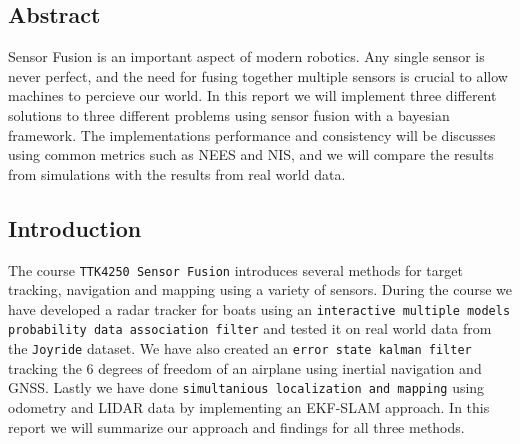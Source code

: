 \subsection{Abstract}
Sensor Fusion is an important aspect of modern robotics. Any single sensor is never perfect, and the need for fusing together multiple sensors is crucial to allow machines to percieve our world. In this report we will implement three different solutions to three different problems using sensor fusion with a bayesian framework. The implementations performance and consistency will be discusses using common metrics such as NEES and NIS, and we will compare the results from simulations with the results from real world data.
\subsection{Introduction}
The course \texttt{TTK4250 Sensor Fusion} introduces several methods for target tracking, navigation and mapping using a variety of sensors. During the course we have developed a radar tracker for boats using an \texttt{interactive multiple models probability data association filter} and tested it on real world data from the \texttt{Joyride} dataset. We have also created an \texttt{error state kalman filter} tracking the 6 degrees of freedom of an airplane using inertial navigation and GNSS. Lastly we have done \texttt{simultanious localization and mapping} using odometry and LIDAR data by implementing an EKF-SLAM approach. In this report we will summarize our approach and findings for all three methods.
